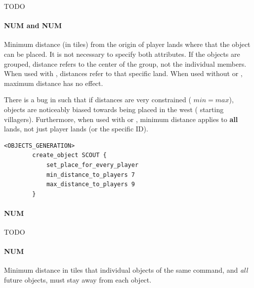 \begin{appendices}
    TODO

    \paragraph{ NUM and  NUM}

    Minimum distance (in tiles) from the origin of player lands where that the object can be placed. It is not necessary to specify both attributes. If the objects are grouped, distance refers to the center of the group, not the individual members. When used with , distances refer to that specific land. When used without  or , maximum distance has no effect.
    
    \begin{attention}
        There is a bug in \aoe{} such that if distances are very constrained (\ie{} $min=max$), objects are noticeably biased towards being placed in the west (\ie{} starting villagers). Furthermore, when used with  or , minimum distance applies to \textbf{all} lands, not just player lands (or the specific ID).
    \end{attention}

    \begin{lstlisting}[language={rms}, caption={Place the starting scout at a distance of 7-9 tiles}]
        <OBJECTS_GENERATION>
        create_object SCOUT {
            set_place_for_every_player
            min_distance_to_players 7
            max_distance_to_players 9
        }
    \end{lstlisting}


    \paragraph{ NUM}

    TODO

    \paragraph{ NUM}

    Minimum distance in tiles that individual objects of the same  command, and \textit{all} future objects, must stay away from each object.


\end{appendices}
